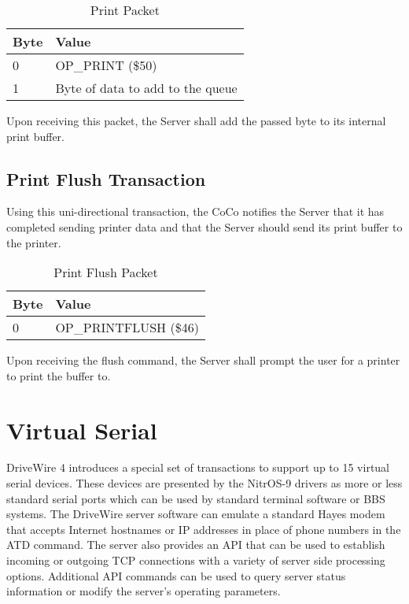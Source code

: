 \documentclass{article}
\begin{document}
\begin{table}[ht]
\caption{Print Packet}
\begin{center}
\begin{tabular}{|ll|}
\hline
Byte & Value \\ \hline
0 & OP\_PRINT (\$50) \\
1 & Byte of data to add to the queue \\
\hline
\end{tabular}
\end{center}
\end{table}

Upon receiving this packet, the Server shall add the passed byte to its internal print buffer.

\subsection{Print Flush Transaction}

Using this uni-directional transaction, the CoCo notifies the Server that it has completed sending printer data and that the Server should send its print buffer to the printer.

\begin{table}[ht]
\caption{Print Flush Packet}
\begin{center}
\begin{tabular}{|ll|}
\hline
Byte & Value \\ \hline
0 & OP\_PRINTFLUSH (\$46) \\
\hline
\end{tabular}
\end{center}
\end{table}

Upon receiving the flush command, the Server shall prompt the user for a printer to print the buffer to.


\section{Virtual Serial}

DriveWire 4 introduces a special set of transactions to support up to 15 virtual serial devices.  These devices are presented by the NitrOS-9 drivers as more or less standard serial ports which can be used by standard terminal software or BBS systems.  The DriveWire server software can emulate a standard Hayes modem that accepts Internet hostnames or IP addresses in place of phone numbers in the ATD command.  The server also provides an API that can be used to establish incoming or outgoing TCP connections with a variety of server side processing options.  Additional API commands can be used to query server status information or modify the server's operating parameters.
\end{document}
